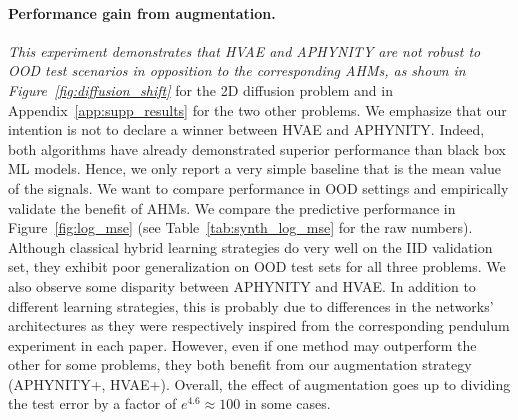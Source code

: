 \documentclass{article}
\newcommand\figref{Figure~\ref}
\newcommand\Cref{Table~\ref}
\newcommand\appref{Appendix~\ref}
\begin{document}
\paragraph{Performance gain from augmentation.}
\textit{This experiment demonstrates that HVAE and APHYNITY are not robust to OOD test scenarios in opposition to the corresponding AHMs, as shown in \figref{fig:diffusion_shift}} for the 2D diffusion problem and in \appref{app:supp_results} for the two other problems. We emphasize that our intention is not to declare a winner between HVAE and APHYNITY. Indeed, both algorithms have already demonstrated superior performance than black box ML models. Hence, we only report a very simple baseline that is the mean value of the signals. We want to compare performance in OOD settings and empirically validate the benefit of AHMs.
We compare the predictive performance in \figref{fig:log_mse} (see \Cref{tab:synth_log_mse} for the raw numbers).  Although classical hybrid learning strategies do very well on the IID validation set, they exhibit poor generalization on OOD test sets for all three problems. We also observe some disparity between APHYNITY and HVAE. In addition to different learning strategies, this is probably due to differences in the networks' architectures as they were respectively inspired from the corresponding pendulum experiment in each paper. However, even if one method may outperform the other for some problems, they both benefit from our augmentation strategy (APHYNITY+, HVAE+). Overall, the effect of augmentation goes up to dividing the test error by a factor of $e^{4.6}\approx 100$ in some cases. 
\end{document}
